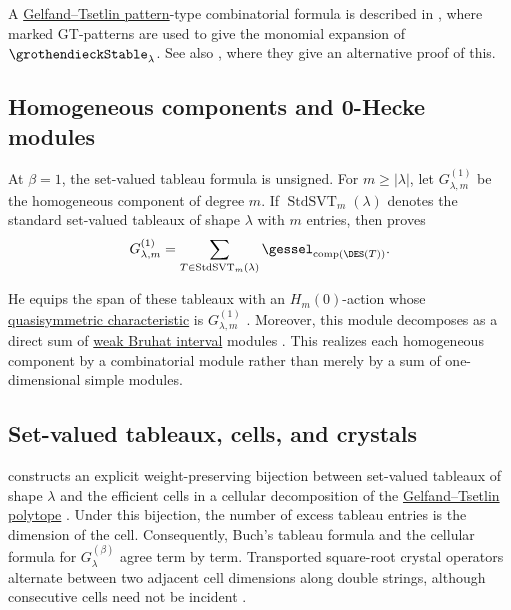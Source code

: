 A \hyperref[gtpatterns]{Gelfand--Tsetlin pattern}-type combinatorial formula is described in \cite{MotegiSakai2014},
where marked GT-patterns are used to give the monomial expansion of $\grothendieckStable_\lambda$.
See also \cite{MonicalPechenikScrimshaw2018}, where they give an alternative proof of this.

\subsection[grothendieckStableZeroHecke]{Homogeneous components and 0-Hecke modules}

At $\beta=1$, the set-valued tableau formula is unsigned.  For $m\geq
|\lambda|$, let $G_{\lambda,m}^{(1)}$ be the homogeneous component of degree
$m$.  If $\operatorname{StdSVT}_m(\lambda)$ denotes the standard set-valued
tableaux of shape $\lambda$ with $m$ entries, then 
proves \cite[Thm.~3.6]{Kim2026x}
\[
  G_{\lambda,m}^{(1)}
  =
  \sum_{T\in\operatorname{StdSVT}_m(\lambda)}
  \gessel_{\operatorname{comp}(\DES(T))}.
\]

He equips the span of these tableaux with an
$H_m(0)$-action whose \hyperref[quasisymmetricCharacteristic]{quasisymmetric
characteristic} is $G_{\lambda,m}^{(1)}$ \cite[Thm.~3.13]{Kim2026x}.
Moreover, this module decomposes as a direct sum of
\hyperref[weakOrder]{weak Bruhat interval} modules
\cite[Thm.~4.12]{Kim2026x}.  This realizes each homogeneous component by a
combinatorial module rather than merely by a sum of one-dimensional simple
modules.

\subsection[grothendieckTableauxGeometry]{Set-valued tableaux, cells, and crystals}

 constructs an explicit weight-preserving bijection
between set-valued tableaux of shape $\lambda$ and the efficient cells in a
cellular decomposition of the \hyperref[gtPolytope]{Gelfand--Tsetlin
polytope} \cite[Thm.~4.3.1]{Smirnov2026x}.  Under this bijection, the number
of excess tableau entries is the dimension of the cell.  Consequently,
Buch's tableau formula and the cellular formula for
$G_\lambda^{(\beta)}$ agree term by term.  Transported square-root crystal
operators alternate between two adjacent cell dimensions along double
strings, although consecutive cells need not be incident
\cite[Thms.~6.1.1 and~6.2.2]{Smirnov2026x}.

